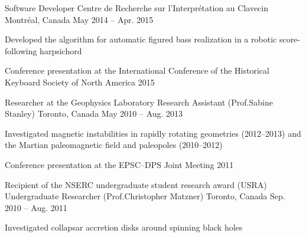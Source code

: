 \begin{cventries}
  \cventry
    {Software Developer}
    {Centre de Recherche sur l'Interpr\'{e}tation au Clavecin}
    {Montr\'{e}al, Canada}
    {May 2014 -- Apr. 2015}
    {
      \begin{cvitems}
        \item {Developed the algorithm for automatic figured bass realization in a robotic score-following harpsichord}
        \item {Conference presentation at the International Conference of the Historical Keyboard Society of North America 2015}
      \end{cvitems}
    }
    
  \cventry
    {Researcher at the Geophysics Laboratory}
    {Research Assistant (Prof.\@ Sabine Stanley)}
    {Toronto, Canada}
    {May 2010 -- Aug. 2013}
    {
      \begin{cvitems}
        \item {Investigated magnetic instabilities in rapidly rotating geometries (2012--2013) and the Martian paleomagnetic field and paleopoles (2010--2012)}
        \item {Conference presentation at the EPSC--DPS Joint Meeting 2011}
      \end{cvitems}
    }
    
  \cventry
    {Recipient of the NSERC undergraduate student research award (USRA)}
    {Undergraduate Researcher (Prof.\@ Christopher Matzner)}
    {Toronto, Canada}
    {Sep. 2010 -- Aug. 2011}
    {
      \begin{cvitems}
        \item {Investigated collapsar accretion disks around spinning black holes}
      \end{cvitems}
    }
    
\end{cventries}
